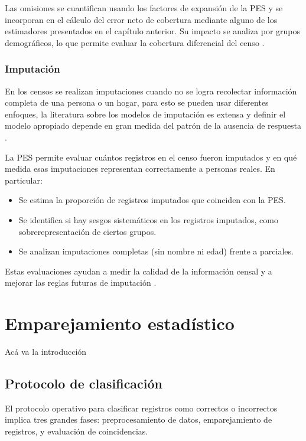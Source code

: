 \documentclass[
  12pt,
]{book}
\providecommand{\tightlist}{%
  \setlength{\itemsep}{0pt}\setlength{\parskip}{0pt}}
\begin{document}
Las omisiones se cuantifican usando los factores de expansión de la PES y se incorporan en el cálculo del error neto de cobertura mediante alguno de los estimadores presentados en el capítulo anterior. Su impacto se analiza por grupos demográficos, lo que permite evaluar la cobertura diferencial del censo \citep{wolter1986coverage, USCensusBureau_2022}.

\subsection{Imputación}\label{imputaciuxf3n}

En los censos se realizan imputaciones cuando no se logra recolectar información completa de una persona o un hogar, para esto se pueden usar diferentes enfoques, la literatura sobre los modelos de imputación es extensa y definir el modelo apropiado depende en gran medida del patrón de la ausencia de respuesta \citep{van2012flexible}.

La PES permite evaluar cuántos registros en el censo fueron imputados y en qué medida esas imputaciones representan correctamente a personas reales. En particular:

\begin{itemize}
\tightlist
\item
  Se estima la proporción de registros imputados que coinciden con la PES.
\item
  Se identifica si hay sesgos sistemáticos en los registros imputados, como sobrerepresentación de ciertos grupos.
\item
  Se analizan imputaciones completas (sin nombre ni edad) frente a parciales.
\end{itemize}

Estas evaluaciones ayudan a medir la calidad de la información censal y a mejorar las reglas futuras de imputación \citep{biemer2003introduction, USCensusBureau_2022}.

\chapter{Emparejamiento estadístico}\label{cap5}

Acá va la introducción

\section{Protocolo de clasificación}\label{protocolo-de-clasificaciuxf3n}

El protocolo operativo para clasificar registros como correctos o incorrectos implica tres grandes fases: preprocesamiento de datos, emparejamiento de registros, y evaluación de coincidencias.
\end{document}
